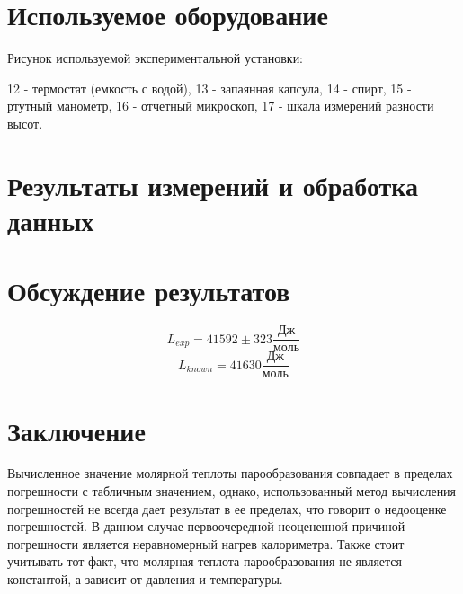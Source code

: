 \documentclass[1 pt]{article}
\begin{document}
\section{Используемое оборудование}
Рисунок используемой экспериментальной установки:
\begin{center}
    
\end{center}
12 - термостат (емкость с водой),
13 - запаянная капсула,
14 - спирт,
15 - ртутный манометр,
16 - отчетный микроскоп,
17 - шкала измерений разности высот.
\newpage
\section{Результаты измерений и обработка данных}
\begin{center}
    
\end{center}
\begin{center}
    
\end{center}
\newpage
\section{Обсуждение результатов}
\begin{equation*}
    L_{exp} = 41592 \pm 323 \frac{Дж}{моль}
\end{equation*}
\begin{equation*}
    L_{known} = 41630 \frac{Дж}{моль}
\end{equation*}
\section{Заключение}
Вычисленное значение молярной теплоты парообразования совпадает в пределах погрешности с табличным значением, однако, использованный метод вычисления погрешностей не всегда дает результат в ее пределах, что говорит о недооценке погрешностей. В данном случае первоочередной неоцененной причиной погрешности является неравномерный нагрев калориметра. Также стоит учитывать тот факт, что молярная теплота парообразования не является константой, а зависит от давления и температуры.
\end{document}
